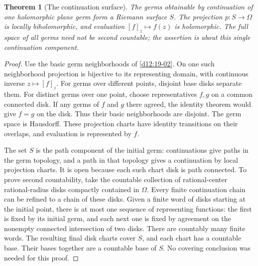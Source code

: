 \documentclass[11pt,a4paper,openany]{book}
\newtheorem{theorem}{Theorem}[chapter]
\theoremstyle{definition}
\theoremstyle{remark}\newtheorem{remark}[theorem]{Remark}
\newcommand{\family}[1]{}
\begin{document}
\begin{theorem}[The continuation surface]\label{d12:20-04}\family{D12.20.04}
The germs obtainable by continuation of one holomorphic plane germ form
a Riemann surface $S$. The projection $p:S\to\Omega$ is locally
biholomorphic, and evaluation $[f]_z\mapsto f(z)$ is holomorphic.
The full space of all germs need not be second countable; the assertion
is about this single continuation component.
\end{theorem}
\begin{proof}
Use the basic germ neighborhoods of \cref{d12:19-02}. On one such
neighborhood projection is bijective to its representing domain, with
continuous inverse $z\mapsto[f]_z$. For germs over different points,
disjoint base disks separate them. For distinct germs over one point,
choose representatives $f,g$ on a common connected disk. If any germs
of $f$ and $g$ there agreed, the identity theorem would give $f=g$ on
the disk. Thus their basic neighborhoods are disjoint. The germ space
is Hausdorff. These projection charts have identity transitions on their
overlaps, and evaluation is represented by $f$.

The set $S$ is the path component of the initial germ: continuations give
paths in the germ topology, and a path in that topology gives a
continuation by local projection charts. It is open because each such
chart disk is path connected. To prove second countability, take the
countable collection of rational-center rational-radius disks compactly
contained in $\Omega$. Every finite continuation chain can be refined
to a chain of these disks. Given a finite word of disks starting at the
initial point, there is at most one sequence of representing functions:
the first is fixed by its initial germ, and each next one is fixed by
agreement on the nonempty connected intersection of two disks. There
are countably many finite words. The resulting final disk charts cover
$S$, and each chart has a countable base. Their bases together are a
countable base of $S$. No covering conclusion was needed for this proof.
\end{proof}
\end{document}
